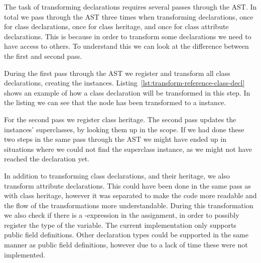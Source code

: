 The task of transforming declarations requires several passes through the AST\@.
In total we pass through the AST three times when transforming declarations, once for class declarations, once for class heritage, and once for class attribute declarations.
This is because in order to transform some declarations we need to have access to others.
To understand this we can look at the difference between the first and second pass.

During the first pass through the AST we register and transform all class declarations, creating the  instances.
Listing~\vref{lst:transform-reference-class-decl} shows an example of how a class declaration will be transformed in this step.
In the listing we can see that the  node has been transformed to a  instance.

For the second pass we register class heritage.
The second pass updates the  instances' superclasses, by looking them up in the scope.
If we had done these two steps in the same pass through the AST we might have ended up in situations where we could not find the superclass instance, as we might not have reached the declaration yet.

In addition to transforming class declarations, and their heritage, we also transform attribute declarations.
This could have been done in the same pass as with class heritage, however it was separated to make the code more readable and the flow of the transformations more understandable.
During this transformation we also check if there is a -expression in the assignment, in order to possibly register the type of the variable.
The current implementation only supports public field definitions.
Other declaration types could be supported in the same manner as public field definitions, however due to a lack of time these were not implemented.

